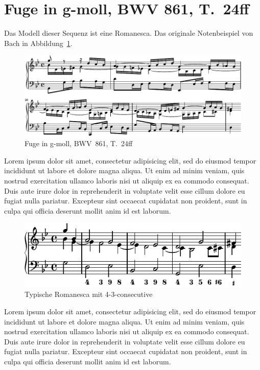 \section{Fuge in g-moll, BWV 861, T.~24ff}

Das Modell dieser Sequenz ist eine Romanesca. Das originale Notenbeispiel von Bach in Abbildung~\ref{fig:bwv681-original}.

\begin{figure}[htbp]
	\centering
	\includegraphics{lilypond/g-moll/render/original}
	\caption{Fuge in g-moll, BWV~861, T.~24ff}
	\label{fig:bwv681-original}
\end{figure}

Lorem ipsum dolor sit amet, consectetur adipisicing elit, sed do eiusmod tempor incididunt ut labore et dolore magna aliqua. Ut enim ad minim veniam, quis nostrud exercitation ullamco laboris nisi ut aliquip ex ea commodo consequat. Duis aute irure dolor in reprehenderit in voluptate velit esse cillum dolore eu fugiat nulla pariatur. Excepteur sint occaecat cupidatat non proident, sunt in culpa qui officia deserunt mollit anim id est laborum.

\begin{figure}[htbp]
	\centering
	\includegraphics{lilypond/g-moll/render/romanesca-standard}
	\caption{Typische Romanesca mit 4-3-consecutive}
	\label{fig:bwv681-standard}
\end{figure}

Lorem ipsum dolor sit amet, consectetur adipisicing elit, sed do eiusmod tempor incididunt ut labore et dolore magna aliqua. Ut enim ad minim veniam, quis nostrud exercitation ullamco laboris nisi ut aliquip ex ea commodo consequat. Duis aute irure dolor in reprehenderit in voluptate velit esse cillum dolore eu fugiat nulla pariatur. Excepteur sint occaecat cupidatat non proident, sunt in culpa qui officia deserunt mollit anim id est laborum.


